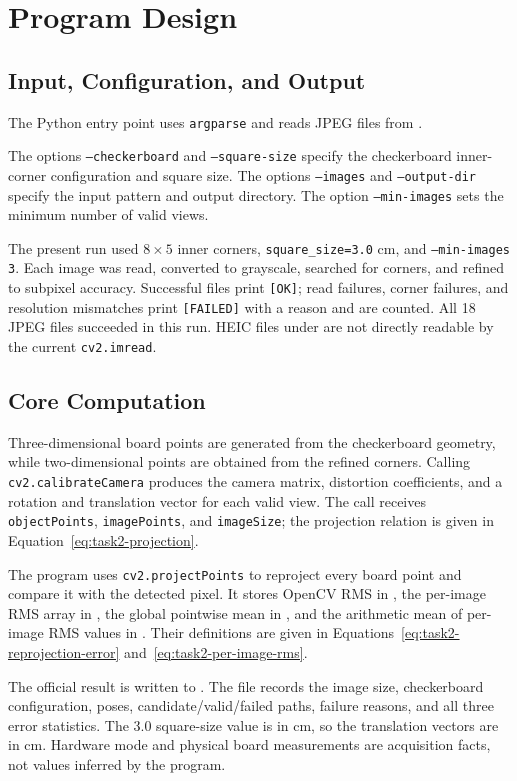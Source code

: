 \section{Program Design}\label{sec:task2-program-design}

\subsection{Input, Configuration, and Output}

The Python entry point uses \texttt{argparse} and reads JPEG files from
.

The options \texttt{--checkerboard} and \texttt{--square-size} specify the checkerboard inner-corner configuration and square size. The options \texttt{--images} and \texttt{--output-dir} specify the input pattern and output directory. The option \texttt{--min-images} sets the minimum number of valid views.

The present run used \(8\times5\) inner corners, \texttt{square\_size=3.0} cm, and
\texttt{--min-images 3}. Each image was read, converted to grayscale, searched for corners, and refined to subpixel accuracy. Successful files print \texttt{[OK]}; read failures, corner failures, and resolution mismatches print \texttt{[FAILED]} with a reason and are counted. All 18 JPEG files succeeded in this run. HEIC files under  are not directly readable by the current \texttt{cv2.imread}.

\subsection{Core Computation}

Three-dimensional board points are generated from the checkerboard geometry, while two-dimensional points are obtained from the refined corners. Calling \texttt{cv2.calibrateCamera} produces the camera matrix, distortion coefficients, and a rotation and translation vector for each valid view. The call receives \texttt{objectPoints}, \texttt{imagePoints}, and \texttt{imageSize}; the projection relation is given in Equation~\ref{eq:task2-projection}.

The program uses \texttt{cv2.projectPoints} to reproject every board point and compare it with the detected pixel. It stores OpenCV RMS in , the per-image RMS array in , the global pointwise mean in , and the arithmetic mean of per-image RMS values in . Their definitions are given in Equations~\ref{eq:task2-reprojection-error} and~\ref{eq:task2-per-image-rms}.

The official result is written to . The file records the image size, checkerboard configuration, poses, candidate/valid/failed paths, failure reasons, and all three error statistics. The 3.0 square-size value is in cm, so the translation vectors are in cm. Hardware mode and physical board measurements are acquisition facts, not values inferred by the program.
